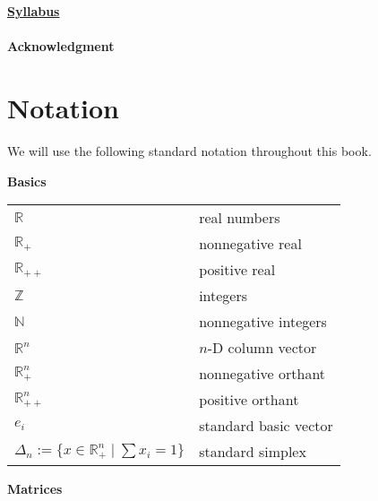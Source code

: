\documentclass[
]{book}
\begin{document}
\href{https://docs.google.com/document/d/1H6Wqht_PVw_n8Jl0kXN3HjZfHkeZJYqYWT4ayxvqRlU/edit?usp=sharing}{\textbf{Syllabus}}

\hypertarget{acknowledgment}{%
\subsubsection*{Acknowledgment}\label{acknowledgment}}

\hypertarget{notation}{%
\chapter*{Notation}\label{notation}}

We will use the following standard notation throughout this book.

\textbf{Basics}

\begin{longtable}[]{@{}
  >{\raggedright\arraybackslash}p{}
  >{\raggedright\arraybackslash}p{}@{}}
\toprule()
\endhead
\(\mathbb{R}^{}\) & real numbers \\
\(\mathbb{R}^{}_{+}\) & nonnegative real \\
\(\mathbb{R}^{}_{++}\) & positive real \\
\(\mathbb{Z}\) & integers \\
\(\mathbb{N}\) & nonnegative integers \\
\(\mathbb{R}^{n}\) & \(n\)-D column vector \\
\(\mathbb{R}^{n}_{+}\) & nonnegative orthant \\
\(\mathbb{R}^{n}_{++}\) & positive orthant \\
\(e_i\) & standard basic vector \\
\(\Delta_n := \{x \in \mathbb{R}^n_{+} \mid \sum x_i = 1 \}\) & standard simplex \\
\bottomrule()
\end{longtable}

\textbf{Matrices}
\end{document}
